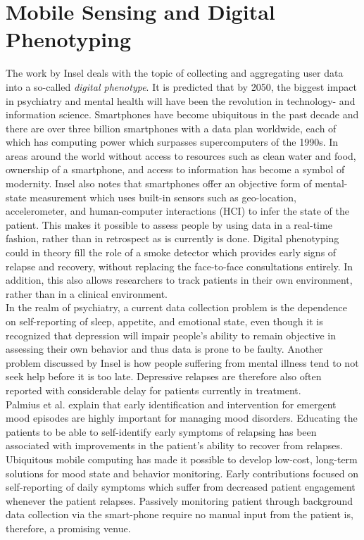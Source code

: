 \section{Mobile Sensing and Digital Phenotyping}
The work by Insel \cite{digital_phenotyping} deals with the topic of collecting and aggregating user data into a so-called \textit{digital phenotype}. It is predicted that by 2050, the biggest impact in psychiatry and mental health will have been the revolution in technology- and information science. Smartphones have become ubiquitous in the past decade and there are over three billion smartphones with a data plan worldwide, each of which has computing power which surpasses supercomputers of the 1990s. In areas around the world without access to resources such as clean water and food, ownership of a smartphone, and access to information has become a symbol of modernity. Insel also notes that smartphones offer an objective form of mental-state measurement which uses built-in sensors such as geo-location, accelerometer, and human-computer interactions (HCI) to infer the state of the patient. This makes it possible to assess people by using data in a real-time fashion, rather than in retrospect as is currently is done. Digital phenotyping could in theory fill the role of a smoke detector which provides early signs of relapse and recovery, without replacing the face-to-face consultations entirely. In addition, this also allows researchers to track patients in their own environment, rather than in a clinical environment.\\

In the realm of psychiatry, a current data collection problem is the dependence on self-reporting of sleep, appetite, and emotional state, even though it is recognized that depression will impair people's ability to remain objective in assessing their own behavior and thus data is prone to be faulty. Another problem discussed by Insel is how people suffering from mental illness tend to not seek help before it is too late. Depressive relapses are therefore also often reported with considerable delay for patients currently in treatment.  \\

Palmius et al. \cite{palmius2017} explain that early identification and intervention for emergent mood episodes are highly important for managing mood disorders. Educating the patients to be able to self-identify early symptoms of relapsing has been associated with improvements in the patient's ability to recover from relapses. Ubiquitous mobile computing has made it possible to develop low-cost, long-term solutions for mood state and behavior monitoring. Early contributions focused on self-reporting of daily symptoms which suffer from decreased patient engagement whenever the patient relapses. Passively monitoring patient through background data collection via the smart-phone require no manual input from the patient is, therefore, a promising venue.